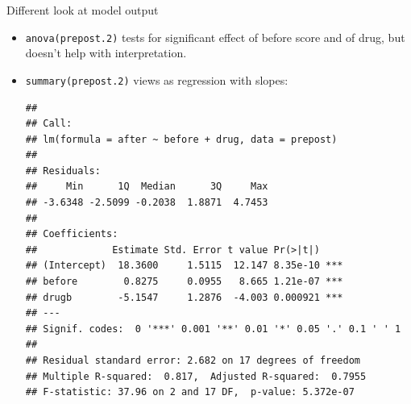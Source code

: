 \begin{frame}[fragile]{Different look at model output}
  
  \begin{itemize}
  \item \texttt{anova(prepost.2)} tests for significant effect of
    before score and of drug, but doesn't help with interpretation.
  \item \texttt{summary(prepost.2)} views as regression with slopes:
    
    \begin{scriptsize}
\begin{knitrout}
\color{fgcolor}\begin{kframe}
\begin{alltt}
\end{alltt}
\begin{verbatim}
## 
## Call:
## lm(formula = after ~ before + drug, data = prepost)
## 
## Residuals:
##     Min      1Q  Median      3Q     Max 
## -3.6348 -2.5099 -0.2038  1.8871  4.7453 
## 
## Coefficients:
##             Estimate Std. Error t value Pr(>|t|)    
## (Intercept)  18.3600     1.5115  12.147 8.35e-10 ***
## before        0.8275     0.0955   8.665 1.21e-07 ***
## drugb        -5.1547     1.2876  -4.003 0.000921 ***
## ---
## Signif. codes:  0 '***' 0.001 '**' 0.01 '*' 0.05 '.' 0.1 ' ' 1
## 
## Residual standard error: 2.682 on 17 degrees of freedom
## Multiple R-squared:  0.817,	Adjusted R-squared:  0.7955 
## F-statistic: 37.96 on 2 and 17 DF,  p-value: 5.372e-07
\end{verbatim}
\end{kframe}
\end{knitrout}
    \end{scriptsize}
  \end{itemize}
  
\end{frame}

